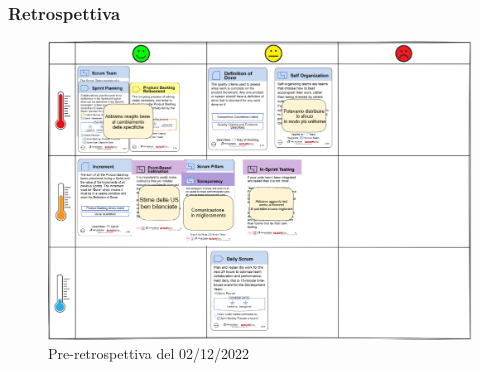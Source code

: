 \subsubsection{Retrospettiva}
\begin{figure}[H]
    \centering
    \includegraphics[width=15cm]{./img/sprint4/retrospettiva.png}
    \caption{Pre-retrospettiva del 02/12/2022}
\end{figure}
